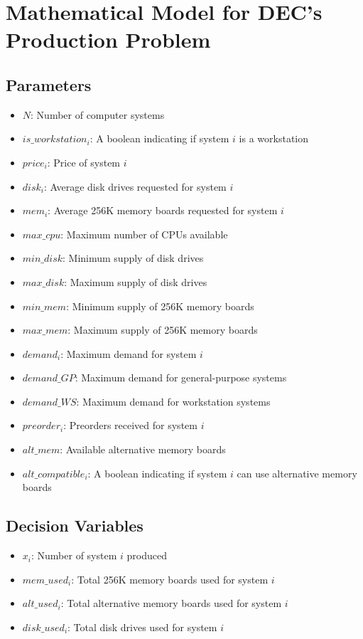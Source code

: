 \documentclass{article}
\begin{document}
\section*{Mathematical Model for DEC's Production Problem}

\subsection*{Parameters}
\begin{itemize}
    \item $N$: Number of computer systems
    \item $is\_workstation_i$: A boolean indicating if system $i$ is a workstation
    \item $price_i$: Price of system $i$
    \item $disk_i$: Average disk drives requested for system $i$
    \item $mem_i$: Average 256K memory boards requested for system $i$
    \item $max\_cpu$: Maximum number of CPUs available
    \item $min\_disk$: Minimum supply of disk drives
    \item $max\_disk$: Maximum supply of disk drives
    \item $min\_mem$: Minimum supply of 256K memory boards
    \item $max\_mem$: Maximum supply of 256K memory boards
    \item $demand_i$: Maximum demand for system $i$
    \item $demand\_GP$: Maximum demand for general-purpose systems
    \item $demand\_WS$: Maximum demand for workstation systems
    \item $preorder_i$: Preorders received for system $i$
    \item $alt\_mem$: Available alternative memory boards
    \item $alt\_compatible_i$: A boolean indicating if system $i$ can use alternative memory boards
\end{itemize}

\subsection*{Decision Variables}
\begin{itemize}
    \item $x_i$: Number of system $i$ produced
    \item $mem\_used_i$: Total 256K memory boards used for system $i$
    \item $alt\_used_i$: Total alternative memory boards used for system $i$
    \item $disk\_used_i$: Total disk drives used for system $i$
\end{itemize}
\end{document}
